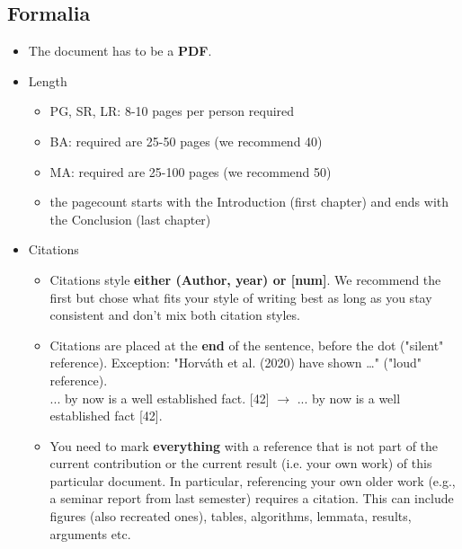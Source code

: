 \documentclass[twocolumn]{mlai-guide}
\newcommand{\cmark}{\textcolor[rgb]{0,0.9,0}{\ding{52}}}%
\newcommand{\xmark}{\textcolor[rgb]{0.9,0,0}{\ding{56}}}%
\newcommand{\eg}[2]{ \xmark #1 $\rightarrow$ \cmark #2}
\begin{document}
\subsection{Formalia}
\begin{itemize}

	\item The document has to be a \textbf{PDF}.

	\item Length
	\begin{itemize}
		\item PG, SR, LR: 8-10 pages per person required
		\item BA: required are 25-50 pages (we recommend 40)
		\item MA: required are 25-100 pages (we recommend 50)
		\item the pagecount starts with the Introduction (first chapter) and ends with the Conclusion (last chapter)
	\end{itemize}

	\item Citations
	\begin{itemize}
		\item Citations style \textbf{either (Author, year) or [num]}. We recommend the first but chose what fits your style of writing best as long as you stay consistent and don't mix both citation styles.
		\item Citations are placed at the \textbf{end} of the sentence, before the dot ("silent" reference). Exception: "Horv\'ath et al. (2020) have shown \dots" ("loud" reference).\\
		\eg{... by now is a well established fact. [42]}{... by now is a well established fact [42].}
		\item You need to mark \textbf{everything} with a reference that is not part of the current contribution or the current result (i.e. your own work) of this particular document. In particular, referencing your own older work (e.g., a seminar report from last semester) requires a citation. This can include figures (also recreated ones), tables, algorithms, lemmata, results, arguments etc.
	\end{itemize}


\end{itemize}
\end{document}
